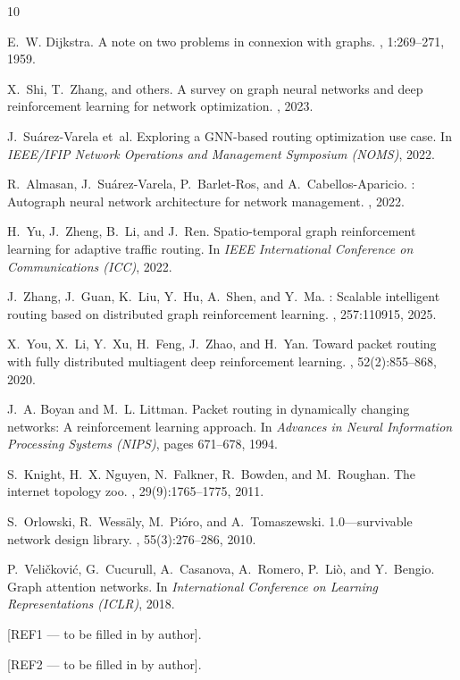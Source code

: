 \documentclass[10pt,twocolumn,letterpaper]{article}
\begin{document}
{\small

\begin{thebibliography}{10}

E.~W. Dijkstra.
\newblock A note on two problems in connexion with graphs.
, 1:269--271, 1959.

X.~Shi, T.~Zhang, and others.
\newblock A survey on graph neural networks and deep reinforcement learning
  for network optimization.
, 2023.

J.~Su{\'a}rez-Varela et~al.
\newblock Exploring a {GNN}-based routing optimization use case.
\newblock In {\em IEEE/IFIP Network Operations and Management Symposium
  (NOMS)}, 2022.

R.~Almasan, J.~Su{\'a}rez-Varela, P.~Barlet-Ros, and A.~Cabellos-Aparicio.
: Autograph neural network architecture for network management.
, 2022.

H.~Yu, J.~Zheng, B.~Li, and J.~Ren.
\newblock Spatio-temporal graph reinforcement learning for adaptive traffic
  routing.
\newblock In {\em IEEE International Conference on Communications (ICC)}, 2022.

J.~Zhang, J.~Guan, K.~Liu, Y.~Hu, A.~Shen, and Y.~Ma.
: Scalable intelligent routing based on distributed graph
  reinforcement learning.
, 257:110915, 2025.

X.~You, X.~Li, Y.~Xu, H.~Feng, J.~Zhao, and H.~Yan.
\newblock Toward packet routing with fully distributed multiagent deep
  reinforcement learning.
,
  52(2):855--868, 2020.

J.~A. Boyan and M.~L. Littman.
\newblock Packet routing in dynamically changing networks: A reinforcement
  learning approach.
\newblock In {\em Advances in Neural Information Processing Systems (NIPS)},
  pages 671--678, 1994.

S.~Knight, H.~X. Nguyen, N.~Falkner, R.~Bowden, and M.~Roughan.
\newblock The internet topology zoo.
,
  29(9):1765--1775, 2011.

S.~Orlowski, R.~Wess{\"a}ly, M.~Pi{\'o}ro, and A.~Tomaszewski.
 1.0---survivable network design library.
, 55(3):276--286, 2010.

P.~Veli{\v{c}}kovi{\'c}, G.~Cucurull, A.~Casanova, A.~Romero, P.~Li{\`o},
  and Y.~Bengio.
\newblock Graph attention networks.
\newblock In {\em International Conference on Learning Representations
  (ICLR)}, 2018.

[REF1 --- to be filled in by author].

[REF2 --- to be filled in by author].

\end{thebibliography}
}
\end{document}
